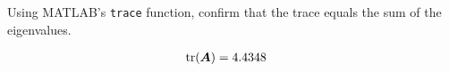 Using MATLAB’s \texttt{trace} function, confirm that the trace equals the sum of the eigenvalues.

\begin{solution}
    \begin{align*}
        \operatorname{tr}(\boldsymbol{A}) &= 4.4348
    \end{align*}
\end{solution}